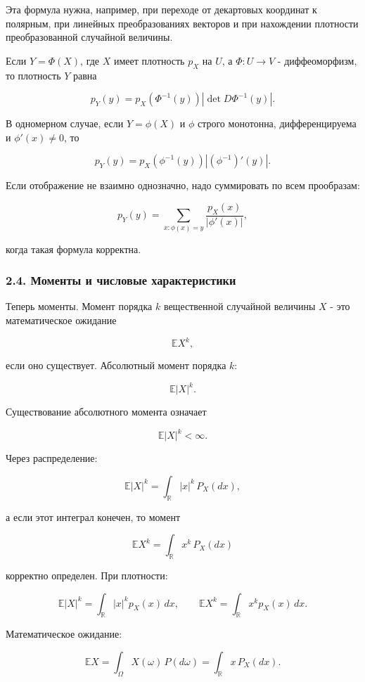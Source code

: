 \documentclass[
  11pt,
  a4paper,
]{article}
\begin{document}
Эта формула нужна, например, при переходе от декартовых координат к
полярным, при линейных преобразованиях векторов и при нахождении
плотности преобразованной случайной величины.

Если \(Y=\Phi(X)\), где \(X\) имеет плотность \(p_X\) на \(U\), а
\(\Phi:U\to V\) - диффеоморфизм, то плотность \(Y\) равна

\[
p_Y(y)
=
p_X(\Phi^{-1}(y))
\left|\det D\Phi^{-1}(y)\right|.
\]

В одномерном случае, если \(Y=\phi(X)\) и \(\phi\) строго монотонна,
дифференцируема и \(\phi'(x)\ne0\), то

\[
p_Y(y)=p_X(\phi^{-1}(y))
\left|(\phi^{-1})'(y)\right|.
\]

Если отображение не взаимно однозначно, надо суммировать по всем
прообразам:

\[
p_Y(y)=\sum_{x:\phi(x)=y}\frac{p_X(x)}{|\phi'(x)|},
\]

когда такая формула корректна.

\subsubsection{2.4. Моменты и числовые
характеристики}\label{ux43cux43eux43cux435ux43dux442ux44b-ux438-ux447ux438ux441ux43bux43eux432ux44bux435-ux445ux430ux440ux430ux43aux442ux435ux440ux438ux441ux442ux438ux43aux438}

Теперь моменты. Момент порядка \(k\) вещественной случайной величины
\(X\) - это математическое ожидание

\[
\mathbb EX^k,
\]

если оно существует. Абсолютный момент порядка \(k\):

\[
\mathbb E|X|^k.
\]

Существование абсолютного момента означает

\[
\mathbb E|X|^k<\infty.
\]

Через распределение:

\[
\mathbb E|X|^k
=
\int_{\mathbb R} |x|^k\,P_X(dx),
\]

а если этот интеграл конечен, то момент

\[
\mathbb EX^k
=
\int_{\mathbb R} x^k\,P_X(dx)
\]

корректно определен. При плотности:

\[
\mathbb E|X|^k=\int_{\mathbb R} |x|^k p_X(x)\,dx,
\qquad
\mathbb EX^k=\int_{\mathbb R} x^k p_X(x)\,dx.
\]

Математическое ожидание:

\[
\mathbb EX=\int_\Omega X(\omega)\,P(d\omega)
=
\int_{\mathbb R} x\,P_X(dx).
\]
\end{document}
